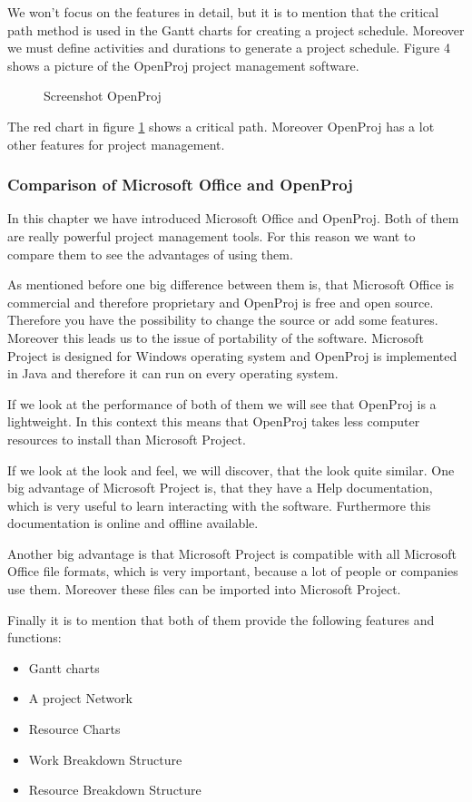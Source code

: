 We won't focus on the features in detail, but it is to mention that the critical path method is used in the Gantt charts for creating a project schedule. Moreover we must define activities and durations to generate a project schedule. Figure 4 shows a picture of the OpenProj project management software.

\begin{figure}[h!!] 
\centerline{}
\caption{Screenshot OpenProj}
\label{pic:openproj}
\end{figure}

The red chart in figure \ref{pic:openproj} shows a critical path. Moreover OpenProj has a lot other features for project management.
\subsubsection{Comparison of Microsoft Office and OpenProj}
In this chapter we have introduced Microsoft Office and OpenProj. Both of them are really powerful project management tools. For this reason we want to compare them to see the advantages of using them.

As mentioned before one big difference between them is, that Microsoft Office is commercial and therefore proprietary and OpenProj is free and open source. Therefore you have the possibility to change the source or add some features.
Moreover this leads us to the issue of  portability of the software. Microsoft Project is designed for Windows operating system and OpenProj is implemented in Java and therefore it can run on every operating system.

If we look at the performance of both of them we will see that OpenProj is a lightweight. In this context this means that OpenProj takes less computer resources to install than Microsoft Project.

If we look at the look and feel, we will discover, that the look quite similar. One big advantage of Microsoft Project is, that they have a Help documentation, which is very useful to learn interacting with the software. Furthermore this documentation is online and offline available.

Another big advantage is that Microsoft Project is compatible with all Microsoft Office file formats, which is very important, because a lot of people or companies use them. Moreover these files can be imported into Microsoft Project.

Finally it is to mention that both of them provide the following features and functions:
\begin{itemize}
\item Gantt charts
\item A project Network
\item Resource Charts
\item Work Breakdown Structure
\item Resource Breakdown Structure
\end{itemize}
